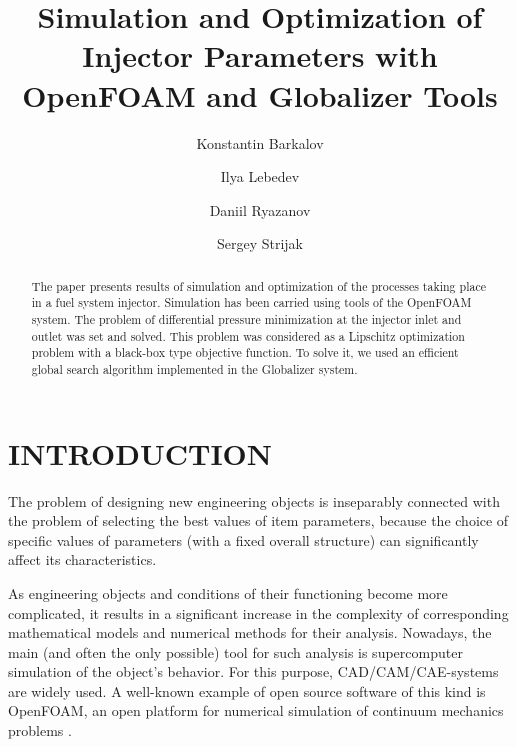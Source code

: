\documentclass{aip-cp}
\begin{document}
\title{Simulation and Optimization of Injector Parameters with OpenFOAM and Globalizer Tools}

\author[aff1]{Konstantin Barkalov}
\author[aff1]{Ilya Lebedev}
\author[aff2]{Daniil Ryazanov}
\author[aff2]{Sergey Strijak}


\maketitle

\begin{abstract}
The paper presents results of simulation and optimization of the processes taking place in a fuel system injector. Simulation has been carried using tools of the OpenFOAM system. The problem of differential pressure minimization at the injector inlet and outlet was set and solved. This problem was considered as a Lipschitz optimization problem with a black-box type objective function. To solve it, we used an efficient global search algorithm implemented in the Globalizer system.
\end{abstract}

\section{INTRODUCTION}

The problem of designing new engineering objects is inseparably connected with the problem of selecting the best values of item parameters, because the choice of specific values of parameters (with a fixed overall structure) can significantly affect its characteristics.

As engineering objects and conditions of their functioning become more complicated, it results in a significant increase in the complexity of corresponding mathematical models and numerical methods for their analysis. Nowadays, the main (and often the only possible) tool for such analysis is supercomputer simulation of the object's behavior. For this purpose, CAD/CAM/CAE-systems are widely used. A well-known example of open source software of this kind is OpenFOAM, an open platform for numerical simulation of continuum mechanics problems \cite{OpenFOAM}.
\end{document}
